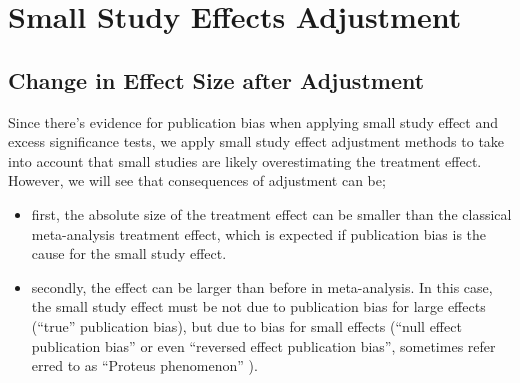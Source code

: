 \documentclass[11pt,a4paper,twoside]{book}\usepackage[]{graphicx}\usepackage[]{color}
\begin{document}

\section{Small Study Effects Adjustment}


\subsection{Change in Effect Size after Adjustment} \label{sec:change.size}

Since there's evidence for publication bias when applying small study effect and excess significance tests, we apply small study effect adjustment methods to take into account that small studies are likely overestimating the treatment effect. \\
However, we will see that consequences of adjustment can be; 
\begin{itemize}
\item first, the absolute size of the treatment effect can be smaller than the classical meta-analysis treatment effect, which is expected if publication bias
is the cause for the small study effect.
\item secondly, the effect can be larger than before in meta-analysis. In this case, the small study effect must be not due to publication bias for large effects (``true'' publication bias), but due to bias for small effects (``null effect publication bias'' or even ``reversed effect publication bias'', sometimes refer erred to as ``Proteus phenomenon'' \citep{proteus}).
\end{itemize}
\end{document}
